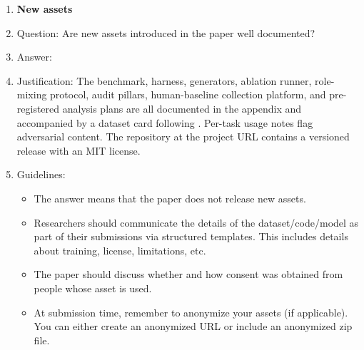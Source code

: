 \begin{enumerate}
\item {\bf New assets}
    \item[] Question: Are new assets introduced in the paper well documented?
    \item[] Answer: \answerYes{}
    \item[] Justification: The benchmark, harness, generators, ablation runner, role-mixing protocol, audit pillars, human-baseline collection platform, and pre-registered analysis plans are all documented in the appendix and accompanied by a dataset card following \citet{gebru2021datasheets}. Per-task usage notes flag adversarial content. The repository at the project URL contains a versioned release with an MIT license.
    \item[] Guidelines:
    \begin{itemize}
        \item The answer \answerNA{} means that the paper does not release new assets.
        \item Researchers should communicate the details of the dataset\slash code\slash model as part of their submissions via structured templates. This includes details about training, license, limitations, etc. 
        \item The paper should discuss whether and how consent was obtained from people whose asset is used.
        \item At submission time, remember to anonymize your assets (if applicable). You can either create an anonymized URL or include an anonymized zip file.
    \end{itemize}


\end{enumerate}
